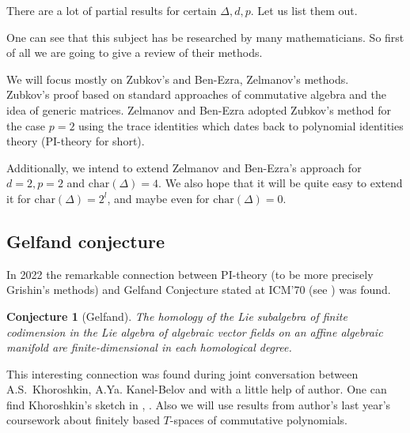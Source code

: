 \documentclass[12pt,a4paper]{article}
\newtheorem*{conjecture*}{Conjecture}
\begin{document}
    There are a lot of partial results for certain $\Delta, d, p$.
    Let us list them out.

    One can see that this subject has be researched by many mathematicians.
    So first of all we are going to give a review of their methods.

    We will focus mostly on Zubkov's and Ben-Ezra, Zelmanov's methods.\\
    Zubkov's proof based on standard approaches of commutative algebra and the idea of generic matrices.
    Zelmanov and Ben-Ezra adopted Zubkov's method for the case $p=2$ using the trace identities which dates back to polynomial identities theory (PI-theory for short).

    Additionally, we intend to extend Zelmanov and Ben-Ezra's approach for $d=2, p=2$ and $\mathrm{char}(\Delta)=4$.
    We also hope that it will be quite easy to extend it for $\mathrm{char}(\Delta)=2^l$, and maybe even for $\mathrm{char}(\Delta)=0$.

    \subsection{Gelfand conjecture}
    In 2022 the remarkable connection between PI-theory (to be more precisely Grishin's methods) and Gelfand Conjecture stated at ICM’70 (see \cite{Gelfand}) was found.
    \vskip 0.1in\noindent
    \begin{conjecture*}[Gelfand]
        The homology of the Lie subalgebra of finite codimension in the Lie algebra of algebraic vector fields on an affine algebraic manifold are finite-dimensional in each
        homological degree.
    \end{conjecture*}
    \vskip 0.1in\noindent
    This interesting connection was found during joint conversation between A.S.\ Khoroshkin, A.Ya. Kanel-Belov and with a little help of author.
    One can find Khoroshkin's sketch in \cite{Feigin}, \cite{Centrone}.
    Also we will use results from author's last year's coursework about finitely based $T$-spaces of commutative polynomials.
\end{document}
